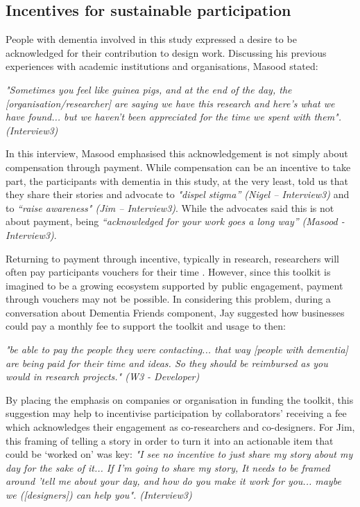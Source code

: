 \subsection{Incentives for sustainable participation}
People with dementia involved in this study expressed a desire to be acknowledged for their contribution to design work. Discussing his previous experiences with academic institutions and organisations, Masood stated:

\textit{"Sometimes you feel like guinea pigs, and at the end of the day, the [organisation/researcher] are saying we have this research and here's what we have found... but we haven't been appreciated for the time we spent with them". (Interview3)}

In this interview, Masood emphasised this acknowledgement is not simply about compensation through payment. While compensation can be an incentive to take part, the participants with dementia in this study, at the very least, told us that they share their stories and advocate to \textit{"dispel stigma” (Nigel – Interview3)} and to \textit{“raise awareness" (Jim – Interview3)}. While the advocates said this is not about payment, being \textit{“acknowledged for your work goes a long way” (Masood - Interview3)}. 

Returning to payment through incentive, typically in research, researchers will often pay participants vouchers for their time \citep{hodge_relational_2020}. However, since this toolkit is imagined to be a growing ecosystem supported by public engagement, payment through vouchers may not be possible. In considering this problem, during a conversation about Dementia Friends component, Jay suggested how businesses could pay a monthly fee to support the toolkit and usage to then:

\textit{"be able to pay the people they were contacting... that way [people with dementia] are being paid for their time and ideas. So they should be reimbursed as you would in research projects." (W3 - Developer)}

By placing the emphasis on companies or organisation in funding the toolkit, this suggestion may help to incentivise participation by collaborators’ receiving a fee which acknowledges their engagement as co-researchers and co-designers. For Jim, this framing of telling a story in order to turn it into an actionable item that could be ‘worked on’ was key: 
\textit{ "I see no incentive to just share my story about my day for the sake of it... If I'm going to share my story, It needs to be framed around 'tell me about your day, and how do you make it work for you... maybe we ([designers]) can help you". (Interview3)}
 
